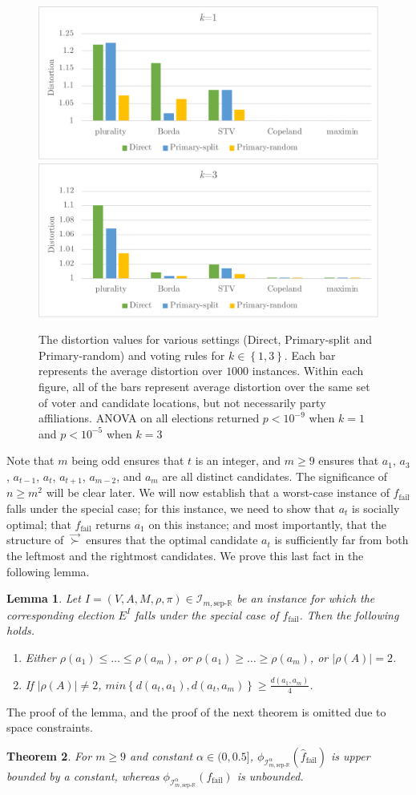 \documentclass[letterpaper]{article} %
\newtheorem{theorem}{Theorem}
\newtheorem{lemma}[theorem]{Lemma}
\theoremstyle{definition}
\newcommand{\set}[1]{\left\{#1\right\}}
\renewcommand{\vec}{\overrightarrow}
\renewcommand{\hat}{\widehat}
\newcommand{\bbR}{\mathbb{R}}
\newcommand{\calI}{\mathcal{I}}
\newcommand{\vsucc}{\vec{\succ}}
\newcommand{\sep}{\textrm{sep-}}
\newcommand{\eucline}{\bbR}
\newcommand{\euclinesep}{\sep\eucline}
\newcommand{\I}{\calI}
\newcommand{\fail}{{\textrm{fail}}}
\begin{document}
\begin{figure}
\centering
\includegraphics[width=0.47\linewidth]{distortion_1.pdf}
\hspace{0.05\linewidth}
\includegraphics[width=0.47\linewidth]{distortion_3.pdf}
\caption {The distortion values for various settings (Direct, Primary-split and Primary-random) and voting rules for $k \in \set{1,3}$. Each bar represents the average distortion over $1000$ instances. Within each figure, all of the bars represent average distortion over the same set of voter and candidate locations, but not necessarily party affiliations. ANOVA on all elections returned $p<10^{-9}$ when $k=1$ and $p<10^{-5}$ when $k=3$}
\label{distortions}
\end{figure}
Note that $m$ being odd ensures that $t$ is an integer, and $m \ge 9$ ensures that $a_1$, $a_3$, $a_{t-1}$, $a_t$, $a_{t+1}$, $a_{m-2}$, and $a_m$ are all distinct candidates. The significance of $n \ge m^2$ will be clear later.
We will now establish that a worst-case instance of $f_\fail$ falls under the special case; for this instance, we need to show that $a_t$ is socially optimal; that $f_\fail$ returns $a_1$ on this instance; and most importantly, that the structure of $\vsucc$ ensures that the optimal candidate $a_t$ is sufficiently far from both the leftmost and the rightmost candidates.
We prove this last fact in the following lemma.
\begin{lemma}
	Let $I = (V,A,M,\rho,\pi) \in \I_{m,\euclinesep}$ be an instance for which the corresponding election $E^I$ falls under the special case of $f_\fail$. Then the following holds.
	\begin{enumerate}
		\item Either $\rho(a_1)\leq\ldots\leq\rho(a_{m})$, or $\rho(a_{1})\geq\ldots\geq\rho(a_{m})$, or $|\rho(A)|=2$.%
		\item If $|\rho(A)|\neq 2$, %
		$min\set{d(a_t,a_1),d(a_t,a_m)} \ge \frac{d(a_1,a_m)}{4}$.
	\end{enumerate}
	\label{lem:special-clause}
\end{lemma}
The proof of the lemma, and the proof of the next theorem is omitted due to space constraints.
\begin{theorem}
	For $m \ge 9$ and constant $\alpha \in (0,0.5]$, $\phi_{\I^{\alpha}_{m,\euclinesep}}(\hat{f}_\fail)$ is upper bounded by a constant, whereas $\phi_{\I^{\alpha}_{m,\euclinesep}}(f_\fail)$ is unbounded.
	\label{thm:primary-much-better}
\end{theorem}
\end{document}

